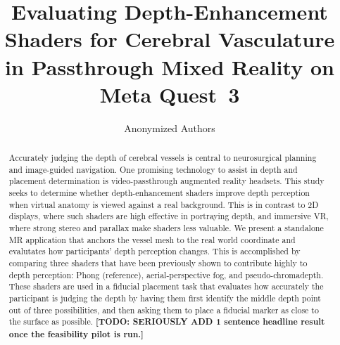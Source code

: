 \documentclass[runningheads]{llncs}
\begin{document}
%
\title{Evaluating Depth-Enhancement Shaders for Cerebral Vasculature in Passthrough Mixed Reality on Meta Quest~3}
%
%
\author{Anonymized Authors}  %
%
\maketitle
%
\begin{abstract}
Accurately judging the depth of cerebral vessels is central to neurosurgical planning and image-guided navigation. One promising technology to assist in depth and placement determination is video-passthrough augmented reality headsets. This study seeks to determine whether depth-enhancement shaders improve depth perception when virtual anatomy is viewed against a real background. This is in contrast to 2D displays, where such shaders are high effective in portraying depth, and immersive VR, where strong stereo and parallax make shaders less valuable. We present a standalone MR application that anchors the vessel mesh to the real world coordinate and evalutates how participants' depth perception changes. This is accomplished by comparing three shaders that have been previously shown to contribute highly to depth perception: Phong (reference), aerial-perspective fog, and pseudo-chromadepth. These shaders are used in a fiducial placement task that evaluates how accurately the participant is judging the depth by having them first identify the middle depth point out of three possibilities, and then asking them to place a fiducial marker as close to the surface as possible. \textbf{[TODO: SERIOUSLY ADD 1 sentence headline result once the feasibility pilot is run.]}

\end{abstract}
\end{document}
